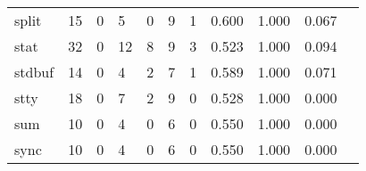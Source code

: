 \begin{longtable}{lp{1.2cm}p{1.2cm}p{1.2cm}p{1.2cm}p{1.2cm}p{1.2cm}p{1.2cm}p{1.2cm}p{1.2cm}p{1.2cm}}
split     &                                    15 &                                                  0 &                                                  5 &                                                  0 &                                                  9 &                                                  1 &                                              0.600 &                                              1.000 &                                              0.067 \\
stat      &                                    32 &                                                  0 &                                                 12 &                                                  8 &                                                  9 &                                                  3 &                                              0.523 &                                              1.000 &                                              0.094 \\
stdbuf    &                                    14 &                                                  0 &                                                  4 &                                                  2 &                                                  7 &                                                  1 &                                              0.589 &                                              1.000 &                                              0.071 \\
stty      &                                    18 &                                                  0 &                                                  7 &                                                  2 &                                                  9 &                                                  0 &                                              0.528 &                                              1.000 &                                              0.000 \\
sum       &                                    10 &                                                  0 &                                                  4 &                                                  0 &                                                  6 &                                                  0 &                                              0.550 &                                              1.000 &                                              0.000 \\
sync      &                                    10 &                                                  0 &                                                  4 &                                                  0 &                                                  6 &                                                  0 &                                              0.550 &                                              1.000 &                                              0.000 \\

\end{longtable}
